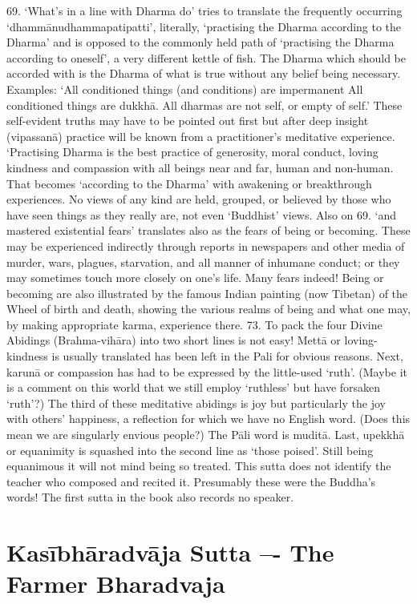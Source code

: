 69. `What's in a line with Dharma do' tries to translate the frequently occurring `dhamm\=anudhammapatipatti', literally, `practising the Dharma according to the Dharma' and is opposed to the commonly held path of `practising the Dharma according to oneself', a very different kettle of fish. The Dharma which should be accorded with is the Dharma of what is true without any belief being necessary.
Examples:
`All conditioned things (and conditions) are impermanent
All conditioned things are dukkh\=a.
All dharmas are not self, or empty of self.'
These self-evident truths may have to be pointed out first but after deep insight (vipassan\=a) practice will be known from a practitioner's meditative experience. `Practising Dharma is the best practice of generosity, moral conduct, loving kindness and compassion with all beings near and far, human and non-human. That becomes `according to the Dharma' with awakening or breakthrough experiences. No views of any kind are held, grouped, or believed by those who have seen things as they really are, not even `Buddhist' views.
Also on 69. `and mastered existential fears' translates also as the fears of being or becoming. These may be experienced indirectly through reports in newspapers and other media of murder, wars, plagues, starvation, and all manner of inhumane conduct; or they may sometimes touch more closely on one's life. Many fears indeed! Being or becoming are also illustrated by the famous Indian painting (now Tibetan) of the Wheel of birth and death, showing the various realms of being and what one may, by making appropriate karma, experience there.
73. To pack the four Divine Abidings (Brahma-vih\=ara) into two short lines is not easy! Mett\=a or loving-kindness is usually translated has been left in the Pali for obvious reasons. Next, karun\=a or compassion has had to be expressed by the little-used `ruth'. (Maybe it is a comment on this world that we still employ `ruthless' but have forsaken `ruth'?) The third of these meditative abidings is joy but particularly the joy with others' happiness, a reflection for which we have no English word. (Does this mean we are singularly envious people?) The P\=ali word is mudit\=a. Last, upekkh\=a or equanimity is squashed into the second line as `those poised'. Still being equanimous it will not mind being so treated.
This sutta does not identify the teacher who composed and recited it. Presumably these were the Buddha's words! The first sutta in the book also records no speaker.
   
    
   \chapter{Kasībh\=aradv\=aja Sutta –- The Farmer Bharadvaja}
   
